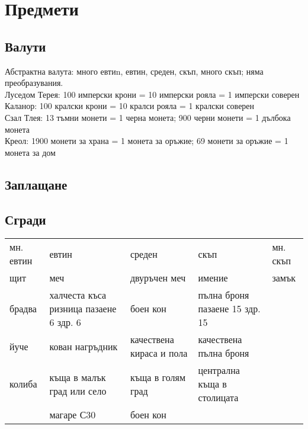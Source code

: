 \section{Предмети}
\subsection{Валути}
Абстрактна валута: много евтиn, евтин, среден, скъп, много скъп; няма преобразувания.  \\
Луседом Терея: 100 имперски крони = 10 имперски рояла = 1 имперски соверен             \\
Каланор: 100 кралски крони = 10 кралси рояла = 1 кралски соверен                       \\
Сзал Тлея: 13 тъмни монети = 1 черна монета; 900 черни монети = 1 дълбока монета       \\
Креол: 1900 монети за храна = 1 монета за оръжие; 69 монети за оръжие = 1 монета за дом\\
\subsection{Заплащане}
\subsection{Сгради}
\begin{tabular}{p{3cm} | p{3cm} | p{3cm} | p{3cm} | p{3cm}}
мн. евтин & евтин                                   & среден                   & скъп                           & мн. скъп  \\
щит       & меч                                     & двуръчен меч             & имение                         & замък     \\
брадва    & халчеста къса ризница пазаене 6 здр. 6  & боен кон                 & пълна броня пазаене 15 здр. 15 &           \\
йуче      & кован нагръдник                         & качествена кираса и пола & качествена пълна броня         &           \\
колиба    & къща в малък град или село              & къща в голям град        & централна къща в столицата                 \\
          & магаре С30                              & боен кон                 &
\end{tabular}

